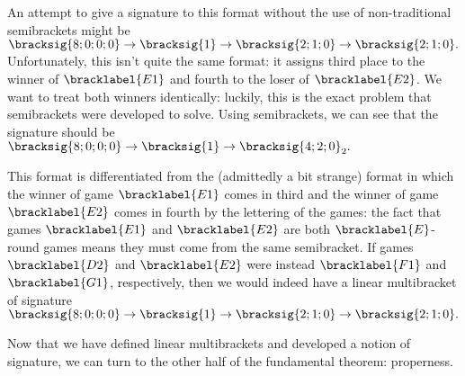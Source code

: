 {    

    An attempt to give a signature to this format without the use of non-traditional semibrackets might be $\bracksig{8;0;0;0} \to \bracksig{1} \to \bracksig{2;1;0} \to \bracksig{2;1;0}.$ Unfortunately, this isn't quite the same format: it assigns third place to the winner of $\bracklabel{E1}$ and fourth to the loser of $\bracklabel{E2}$. We want to treat both winners identically: luckily, this is the exact problem that semibrackets were developed to solve. Using semibrackets, we can see that the signature should be $\bracksig{8;0;0;0} \to \bracksig{1} \to \bracksig{4;2;0}_2.$


    This format is differentiated from the (admittedly a bit strange) format in which the winner of game $\bracklabel{E1}$ comes in third and the winner of game $\bracklabel{E2}$ comes in fourth by the lettering of the games: the fact that games $\bracklabel{E1}$ and $\bracklabel{E2}$ are both $\bracklabel{E}$-round games means they must come from the same semibracket. If games $\bracklabel{D2}$ and $\bracklabel{E2}$ were instead $\bracklabel{F1}$ and $\bracklabel{G1}$, respectively, then we would indeed have a linear multibracket of signature $\bracksig{8;0;0;0} \to \bracksig{1} \to \bracksig{2;1;0} \to \bracksig{2;1;0}.$

    Now that we have defined linear multibrackets and developed a notion of signature, we can turn to the other half of the fundamental theorem: properness.
}
